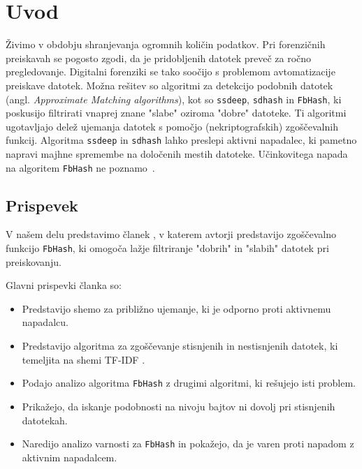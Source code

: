 \documentclass{acm_proc_article-sp}
\begin{document}


\section{Uvod}
Živimo v obdobju shranjevanja ogromnih količin podatkov. Pri forenzičnih preiskavah se pogosto zgodi, da je pridobljenih datotek preveč za ročno pregledovanje. Digitalni forenziki se tako soočijo s problemom avtomatizacije preiskave datotek. Možna rešitev so algoritmi za detekcijo podobnih datotek (angl. \emph{Approximate Matching algorithms}), kot so \texttt{ssdeep}, \texttt{sdhash} in \texttt{FbHash}, ki poskusijo filtrirati vnaprej znane "slabe" oziroma "dobre" datoteke. Ti algoritmi ugotavljajo delež ujemanja datotek s pomočjo (nekriptografskih) zgoščevalnih funkcij. Algoritma \texttt{ssdeep} in \texttt{sdhash} lahko preslepi aktivni napadalec, ki pametno napravi majhne spremembe na določenih mestih datoteke. Učinkovitega napada na algoritem \texttt{FbHash} ne poznamo~\cite{fbhash}.

\subsection{Prispevek}

V našem delu predstavimo članek \cite{fbhash}, v katerem avtorji predstavijo zgoščevalno funkcijo \texttt{FbHash}, ki omogoča lažje filtriranje "dobrih" in "slabih" datotek pri preiskovanju. 

Glavni prispevki članka \cite{fbhash} so:
\begin{itemize}
  \item Predstavijo shemo za približno ujemanje, ki je odporno proti aktivnemu napadalcu.
  \item Predstavijo algoritma za zgoščevanje stisnjenih in nestisnjenih datotek, ki temeljita na shemi TF-IDF \cite{Ramos_usingtf-idf}.
  \item Podajo analizo algoritma \texttt{FbHash} z drugimi algoritmi, ki rešujejo isti problem.
  \item Prikažejo, da iskanje podobnosti na nivoju bajtov ni dovolj pri stisnjenih datotekah.
  \item Naredijo analizo varnosti za \texttt{FbHash} in pokažejo, da je varen proti napadom z aktivnim napadalcem.
\end{itemize}
\end{document}
